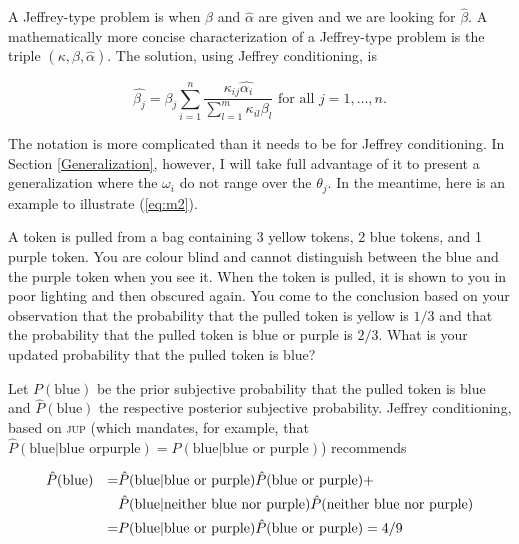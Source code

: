 A Jeffrey-type problem is when $\beta$ and $\hat{\alpha}$ are given
and we are looking for $\hat{\beta}$. A mathematically more concise
characterization of a Jeffrey-type problem is the triple
$(\kappa,\beta,\hat{\alpha})$. The solution, using Jeffrey
conditioning, is

\begin{equation}
  \label{eq:m2}
  \hat{\beta_{j}}=\beta_{j}\sum_{i=1}^{n}\frac{\kappa_{ij}\hat{\alpha_{i}}}{\sum_{l=1}^{m}\kappa_{il}\beta_{l}}\mbox{ for all }j=1,\ldots,n.
\end{equation}

{\noindent}The notation is more complicated than it needs to be for Jeffrey
conditioning. In Section \ref{Generalization}, however, I will take
full advantage of it to present a generalization where the
$\omega_{i}$ do not range over the $\theta_{j}$. In the meantime, here
is an example to illustrate (\ref{eq:m2}).

\begin{quotex}
  A token is pulled from a bag containing 3 yellow tokens, 2 blue
  tokens, and 1 purple token. You are colour blind and cannot
  distinguish between the blue and the purple token when you see it.
  When the token is pulled, it is shown to you in poor lighting and
  then obscured again. You come to the conclusion based on your
  observation that the probability that the pulled token is yellow is
  $1/3$ and that the probability that the pulled token is blue or
  purple is $2/3$. What is your updated probability that the pulled
  token is blue?
\end{quotex}

{\noindent}Let $P(\mbox{blue})$ be the prior subjective probability that the
pulled token is blue and $\hat{P}(\mbox{blue})$ the respective posterior
subjective probability. Jeffrey conditioning, based on \textsc{jup}
(which mandates, for example, that 
$\hat{P}(\mbox{blue}|\mbox{blue or}\mbox{
  purple})=P(\mbox{blue}|\mbox{blue or purple})$) recommends

\begin{align}
  \label{eq:jcs}
&\hat{P}(\mbox{blue})&=&\hat{P}(\mbox{blue}|\mbox{blue or purple})\hat{P}(\mbox{blue or
  purple})+\notag \\
&&&\hat{P}(\mbox{blue}|\mbox{neither blue nor
  purple})\hat{P}(\mbox{neither blue nor purple})\notag \\
&&=&P(\mbox{blue}|\mbox{blue or purple})\hat{P}(\mbox{blue or
  purple})=4/9
\end{align}

